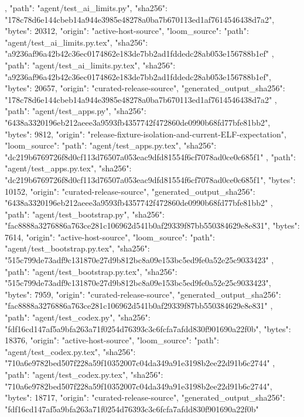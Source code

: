{{    },
    {
      "path": "agent/test_ai_limits.py",
      "sha256": "178c78d6e144cbeb14a944e3985e48278a0ba7b670113ed1af7614546438d7a2",
      "bytes": 20312,
      "origin": "active-host-source",
      "loom_source": {
        "path": "agent/test_ai_limits.py.tex",
        "sha256": "a9236af96a42b42c36ec0174862e183de7bb2ad1fddedc28ab053e156788b1ef"
      }
    },
    {
      "path": "agent/test_ai_limits.py.tex",
      "sha256": "a9236af96a42b42c36ec0174862e183de7bb2ad1fddedc28ab053e156788b1ef",
      "bytes": 20657,
      "origin": "curated-release-source",
      "generated_output_sha256": "178c78d6e144cbeb14a944e3985e48278a0ba7b670113ed1af7614546438d7a2"
    },
    {
      "path": "agent/test_apps.py",
      "sha256": "6438a3320196eb212aeee3a9593fb4357742f472860de0990b68fd77bfe81bb2",
      "bytes": 9812,
      "origin": "release-fixture-isolation-and-current-ELF-expectation",
      "loom_source": {
        "path": "agent/test_apps.py.tex",
        "sha256": "dc219b6769726f8d0cf113d76507a053eac9dfd81554f6cf7078ad0ce0c685f1"
      }
    },
    {
      "path": "agent/test_apps.py.tex",
      "sha256": "dc219b6769726f8d0cf113d76507a053eac9dfd81554f6cf7078ad0ce0c685f1",
      "bytes": 10152,
      "origin": "curated-release-source",
      "generated_output_sha256": "6438a3320196eb212aeee3a9593fb4357742f472860de0990b68fd77bfe81bb2"
    },
    {
      "path": "agent/test_bootstrap.py",
      "sha256": "fac8888a3276886a763ce281c106962d541b0af29339f87bb550384629e8e831",
      "bytes": 7614,
      "origin": "active-host-source",
      "loom_source": {
        "path": "agent/test_bootstrap.py.tex",
        "sha256": "515c799de73adf9c131870e27d9b812bc8a09e153bc5ed9fe0a52e25c9033423"
      }
    },
    {
      "path": "agent/test_bootstrap.py.tex",
      "sha256": "515c799de73adf9c131870e27d9b812bc8a09e153bc5ed9fe0a52e25c9033423",
      "bytes": 7959,
      "origin": "curated-release-source",
      "generated_output_sha256": "fac8888a3276886a763ce281c106962d541b0af29339f87bb550384629e8e831"
    },
    {
      "path": "agent/test_codex.py",
      "sha256": "fdf16cd147af5a9bfa263a71f0254d76393c3c6fcfa7afdd830f901690a22f0b",
      "bytes": 18376,
      "origin": "active-host-source",
      "loom_source": {
        "path": "agent/test_codex.py.tex",
        "sha256": "710a6e9782bed507f228a59f10352007c04da349a91e3198b2ee22d91b6c2744"
      }
    },
    {
      "path": "agent/test_codex.py.tex",
      "sha256": "710a6e9782bed507f228a59f10352007c04da349a91e3198b2ee22d91b6c2744",
      "bytes": 18717,
      "origin": "curated-release-source",
      "generated_output_sha256": "fdf16cd147af5a9bfa263a71f0254d76393c3c6fcfa7afdd830f901690a22f0b"
}}
